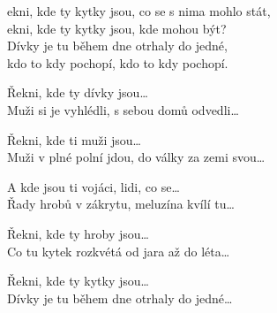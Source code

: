 
\ve{}
ekni, kde ty kytky jsou, co se s nima mohlo stát,\\
ekni, kde ty kytky jsou, kde mohou být?\\
Dívky je tu během dne otrhaly do jedné,\\
kdo to kdy pochopí, kdo to kdy pochopí.

\ve{}
Řekni, kde ty dívky jsou\ldots{}\\
Muži si je vyhlédli, s sebou domů odvedli\ldots{}

\ve{}
Řekni, kde ti muži jsou\ldots{}\\
Muži v plné polní jdou, do války za zemi svou\ldots{}

\ve{}
A kde jsou ti vojáci, lidi, co se\ldots{}\\
Řady hrobů v zákrytu, meluzína kvílí tu\ldots{}

\ve{}
Řekni, kde ty hroby jsou\ldots{}\\
Co tu kytek rozkvétá od jara až do léta\ldots{}

\ve{}
Řekni, kde ty kytky jsou\ldots{}\\
Dívky je tu během dne otrhaly do jedné\ldots{}

\esong{}